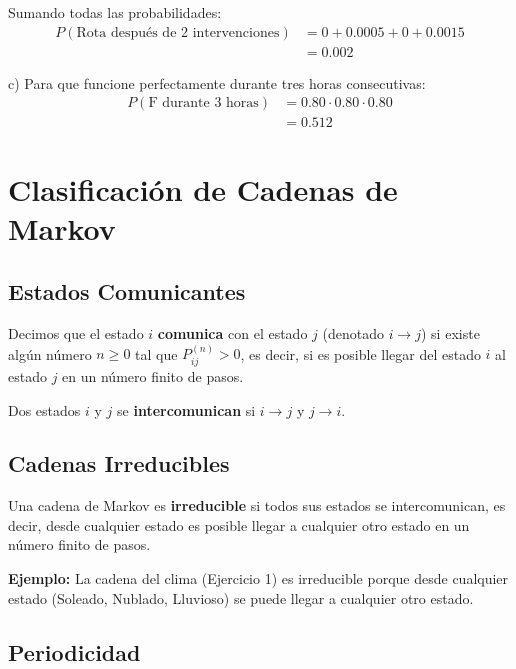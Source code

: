 \documentclass[a4paper,11pt]{article}
\begin{document}
Sumando todas las probabilidades:
\[
\begin{split}
P(\text{Rota después de 2 intervenciones}) &= 0 + 0.0005 + 0 + 0.0015 \\
&= 0.002
\end{split}
\]

\vspace{0.5em}

c) Para que funcione perfectamente durante tres horas consecutivas:
\[
\begin{split}
P(\text{F durante 3 horas}) &= 0.80 \cdot 0.80 \cdot 0.80 \\
&= 0.512
\end{split}
\]

\section{Clasificación de Cadenas de Markov}

\subsection{Estados Comunicantes}

Decimos que el estado $i$ \textbf{comunica} con el estado $j$ (denotado $i \rightarrow j$) si existe algún número $n \geq 0$ tal que $P_{ij}^{(n)} > 0$, es decir, si es posible llegar del estado $i$ al estado $j$ en un número finito de pasos.

\vspace{0.5em}

Dos estados $i$ y $j$ se \textbf{intercomunican} si $i \rightarrow j$ y $j \rightarrow i$.

\subsection{Cadenas Irreducibles}

Una cadena de Markov es \textbf{irreducible} si todos sus estados se intercomunican, es decir, desde cualquier estado es posible llegar a cualquier otro estado en un número finito de pasos.

\vspace{0.5em}

\textbf{Ejemplo:} La cadena del clima (Ejercicio 1) es irreducible porque desde cualquier estado (Soleado, Nublado, Lluvioso) se puede llegar a cualquier otro estado.

\subsection{Periodicidad}
\end{document}
